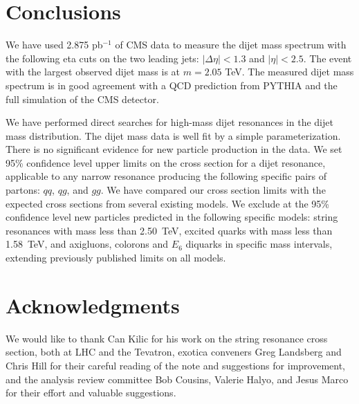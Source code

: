 \section{Conclusions}

We have used 2.875 pb$^{-1}$ of CMS data to measure the dijet mass spectrum
with the following eta cuts on the two leading jets: $\mid \Delta\eta \mid < 1.3$ and 
$\mid \eta \mid < 2.5$. The event with the largest observed dijet mass is at
 $m=2.05$ TeV. The measured dijet mass spectrum 
is in good agreement with a QCD prediction from PYTHIA and the full simulation of 
the CMS detector.


We have performed direct searches for high-mass dijet resonances in the
dijet mass distribution. The dijet mass data is well fit by a simple parameterization. There is no significant evidence for new particle production
in the data.  We set 95\% confidence level upper limits on the cross section for
a dijet resonance, applicable to any narrow resonance producing the following
specific pairs of partons:  $qq$, $qg$, and $gg$.  We have compared our cross section
limits with the expected cross sections from several existing models. 
We exclude at the 95\% confidence level new particles predicted 
in the following specific models: string resonances with mass less than 2.50~TeV, excited quarks with mass less than 1.58~TeV, 
and axigluons, colorons and $E_6$ diquarks in specific mass intervals, extending previously 
published limits on all models.


\section{Acknowledgments}

We would like to thank Can Kilic for his work on the string resonance
cross section, both at LHC and the Tevatron, exotica conveners Greg Landsberg and Chris Hill for their
careful reading of the note and suggestions for improvement, and the analysis review committee 
Bob Cousins, Valerie Halyo, and Jesus Marco for their effort and valuable suggestions.
